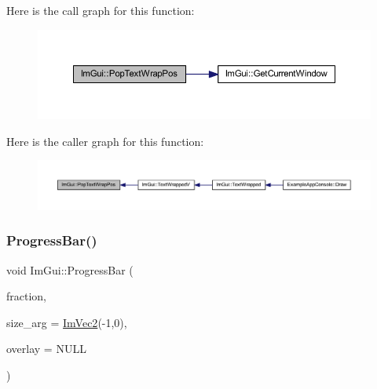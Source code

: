 Here is the call graph for this function\+:
\nopagebreak
\begin{figure}[H]
\begin{center}
\leavevmode
\includegraphics[width=350pt]{namespace_im_gui_a08000421b9cc13757430efe54178ae0f_cgraph}
\end{center}
\end{figure}
Here is the caller graph for this function\+:
\nopagebreak
\begin{figure}[H]
\begin{center}
\leavevmode
\includegraphics[width=350pt]{namespace_im_gui_a08000421b9cc13757430efe54178ae0f_icgraph}
\end{center}
\end{figure}
\mbox{\label{namespace_im_gui_a83349d38c7c73f92ae977bc5b530a9e9}} 
\subsubsection{\texorpdfstring{Progress\+Bar()}{ProgressBar()}}
{\footnotesize\ttfamily void Im\+Gui\+::\+Progress\+Bar (\begin{DoxyParamCaption}\item[{float}]{fraction,  }\item[{const \mbox{\hyperlink{struct_im_vec2}{Im\+Vec2}} \&}]{size\+\_\+arg = {\ttfamily \mbox{\hyperlink{struct_im_vec2}{Im\+Vec2}}(-\/1,0)},  }\item[{const char $\ast$}]{overlay = {\ttfamily NULL} }\end{DoxyParamCaption})}

